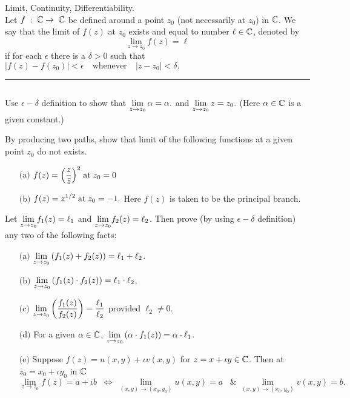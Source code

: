\documentclass[11pt,addpoints,answers]{exam}
\begin{document}
 Limit, Continuity, Differentiability.\\
 Let $f\;:\;\mathbb{C} \rightarrow \; \mathbb{C}$ be defined  around a point $z_0$ (not necessarily at $z_0$) in $\mathbb{C}$. We say that the limit of $f(z)$ at $z_0$ exists and equal to number $\ell\in \mathbb{C}$, denoted by 
\[\lim_{z\rightarrow z_0}f(z)=\ell\]
if for each $\epsilon$ there is a $\delta>0$ such that
\(
|f(z)-f(z_0)|<\epsilon\quad\mbox{whenever}\quad |z-z_0|<\delta.
\)
\\
\hrule$~~$\\

\begin{questions}
\question Use $\epsilon-\delta$ definition to show that \quad
\(\mathlarger{\lim_{z\rightarrow z_0}\alpha=\alpha.}\) and \(\mathlarger{\lim_{z\rightarrow z_0}z=z_0.} 
\) (Here $\alpha \in \mathbb{C}$ is a given constant.)

\question By producing two paths, show that  limit of the following functions at a given point $z_0$ do not exists.
\begin{enumerate} 
\item [$($\rm a$)$] $f(z)=\mathlarger{\left(\frac{z}{\bar{z}}\right)^2} \mbox{\;at\;} z_0=0$
\item [$($\rm b$)$] $f(z)=\mathlarger{z^{1/2}}\mbox{\;at\;} z_0=-1.$  Here $f(z)$ is taken to be the principal branch. 
\end{enumerate}

\question  Let $\mathlarger{\lim_{z\rightarrow z_0}}f_1(z)=\ell_1$ and $\mathlarger{\lim_{z\rightarrow z_0}}f_2(z)=\ell_2$. Then prove (by using $\epsilon-\delta$ definition) any two of the following facts:
\begin{enumerate} 
\item [$($\rm a$)$] $\mathlarger{\lim_{z\rightarrow z_0}\left(f_1(z)+f_2(z)\right)}=\ell_1+\ell_2$.
\item [$($\rm b$)$] $\mathlarger{\lim_{z\rightarrow z_0}\left(f_1(z)\cdot f_2(z)\right)}=\ell_1\cdot \ell_2$.
\item [$($\rm c$)$] $\mathlarger{\lim_{z\rightarrow z_0}\left(\frac{f_1(z)}{f_2(z)}\right)=\frac{\ell_1}{\ell_2}}$ \quad provided $\ell_2\neq 0$.
\item [$($\rm d$)$]  For a given $\alpha \in \mathbb{C}$, $\mathlarger{\lim_{z\rightarrow z_0}}\left(\alpha\cdot f_1(z)\right)=\alpha\cdot \ell_1$.
\item [$($\rm e$)$]  Suppose $f(z)=u(x,y)+\iota v(x,y)$ for $z=x+\iota y\in \mathbb{C}$. Then at $z_0=x_0+\iota y_0$ in $\mathbb{C}$ 
\[
\lim_{z\rightarrow z_0}f(z)=a+\iota b \;\;\iff \;\lim_{(x,y)\rightarrow (x_0,y_0)}u(x,y)=a \;\;\;\&\;\lim_{(x,y)\rightarrow (x_0,y_0)}v(x,y)=b.
\]
\end{enumerate}


\end{questions}
\end{document}

